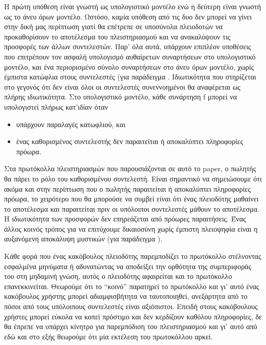 \documentclass[a4paper,11pt]{article}
\begin{document}
Η πρώτη υπόθεση είναι γνωστή ως υπολογιστικό μοντέλο ενώ η δεύτερη είναι γνωστή ως το άνευ όρων μοντέλο.
Ωστόσο, καμία υπόθεση από τις δυο δεν μπορεί να γίνει στην δική μας περίπτωση γιατί θα επέτρεπε σε υποσύνολα
πλειοδοτών να προκαθορίσουν το αποτέλεσμα του πλειστηριασμού και να ανακαλύψουν τις προσφορές των άλλων
συντελεστών. Παρ' όλα αυτά, υπάρχουν επιπλέον υποθέσεις που επιτρέπουν τον ασφαλή υπολογισμό αυθαίρετων
συναρτήσεων στο υπολογιστικό μοντέλο, και ένα περιορισμένο σύνολο συναρτήσεων στο άνευ όρων μοντέλο, χωρίς
έμπιστα κατώφλια στους συντελεστές (για παράδειγμα \cite{Goldreich,GL,Pass}. Ιδιωτικότητα που στηρίζεται στο γεγονός ότι δεν είναι όλοι οι συντελεστές
συνεννοημένοι θα αναφέρεται ως πλήρης ιδιωτικότητα. Στο υπολογιστικό μοντέλο, κάθε συνάρτηση f μπορεί να
υπολογιστεί πλήρως κατ'ιδίαν όταν 
\begin{itemize}
	\item υπάρχουν παραλαγές κατωφλιού, και 
	\item ένας καθορισμένος συντελεστής δεν παραιτείται ή αποκαλύπτει πληροφορίες πρόωρα.
\end{itemize}

Στα πρωτόκολλα πλειστηριασμών που παρουσιάζονται σε αυτό το paper, ο πωλητής θα πάρει το ρόλο του καθορισμένου
συντελεστή. Είναι σημαντικό να σημειώσουμε ότι ακόμα και στην περίπτωση που ο πωλητής παραιτείται ή
αποκαλύπτει πληροφορίες πρόωρα, το χειρότερο που θα μπορούσε να συμβεί είναι ότι ένας πλειοδότης μαθαίνει το
αποτέλεσμα και παραιτείται πριν οι υπόλοιποι συντελεστές μάθουν το αποτέλεσμα. Η ιδιωτικότητα των προσφορών
δεν επηρεάζεται από πρόωρες παραιτήσεις. Ένας άλλος κοινός τρόπος για να επιτύχουμε δικαιοσύνη χωρίς έμπιστη
πλειοψηφία είναι η αυξανόμενη αποκάλυψη μυστικών (για παράδειγμα \cite{GMY,GL,Yao}).

Κάθε φορά που ένας κακόβουλος πλειοδότης παρεμποδίζει το πρωτόκολλο στέλνοντας εσφαλμένα μηνύματα ή
αδυνατώντας να αποδείξει την ορθότητα της συμπεριφοράς του στη μηδαμινή γνώση, αυτός ο πλειοδότης αφαιρείται
και το πρωτόκολλο επανεκκινείται. Θεωρούμε ότι το “κοινό” παρατηρεί το πρωτόκολλο και γι’ αυτό ένας κακόβουλος
χρήστης μπορεί αδιαμφισβήτητα να ταυτοποιηθεί, ανεξάρτητα από το πόσοι από τους υπόλοιπους συντελεστές είναι
αξιόπιστοι. Επειδή στους κακόβουλους χρήστες μπορεί εύκολα να κοπεί πρόστιμο και δεν κερδίζουν καθόλου
πληροφορίες, δε θα έπρεπε να υπάρχει κίνητρο για παρεμπόδιση του πλειστηριασμού και γι’ αυτό από εδώ και στο
εξής θεωρούμε ότι μία εκτέλεση του πρωτοκόλλου αρκεί.
\end{document}
